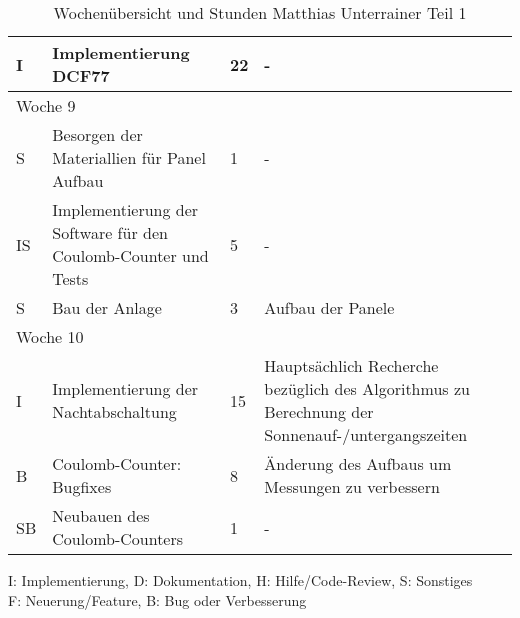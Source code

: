 \begin{table}[!hp]
\begin{center}
\begin{tabular}{|p{0.8cm}|p{6cm}|p{0.8cm}|p{8cm}|}
        I & Implementierung DCF77 & 22 & - \\ \hline
        \multicolumn{4}{|l|}{Woche 9}                                                            \\ \hline
        S & Besorgen der Materiallien für Panel Aufbau & 1 & - \\
        IS & Implementierung der Software für den Coulomb-Counter und Tests & 5 & - \\
        S & Bau der Anlage & 3 & Aufbau der Panele \\  \hline
        \multicolumn{4}{|l|}{Woche 10}                                                           \\ \hline
        I & Implementierung der Nachtabschaltung & 15 & Hauptsächlich Recherche bezüglich des Algorithmus zu Berechnung der Sonnenauf-/untergangszeiten \\ 
        B & Coulomb-Counter: Bugfixes & 8 & Änderung des Aufbaus um Messungen zu verbessern \\ 
        SB & Neubauen des Coulomb-Counters & 1 & - \\\hline           
    \end{tabular}
    \end{center}
    \label{tab:overviewMatthias1}
    \caption{Wochenübersicht und Stunden Matthias Unterrainer Teil 1}
        I: Implementierung, D: Dokumentation, H: Hilfe/Code-Review, S: Sonstiges\\
        F: Neuerung/Feature, B: Bug oder Verbesserung\\
        
\end{table}

\vspace{1em}

